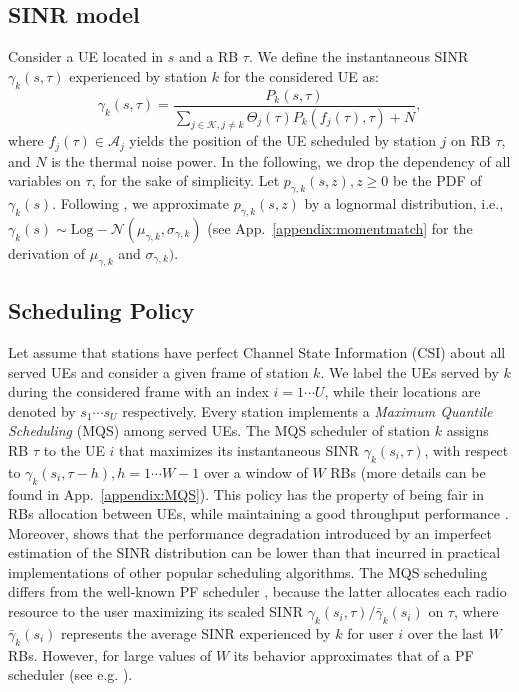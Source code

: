 \documentclass[draftcls,onecolumn]{IEEEtran}
\theoremstyle{plain}
\theoremstyle{definition}
\begin{document}
\subsection{SINR model}\label{subsec:sinrmodel}
Consider a UE located in $s$ and a RB $\tau$. We define the instantaneous SINR $\gamma_k(s,\tau)$ experienced by station $k$ for the considered UE as:
\begin{equation}\label{eq:sinrdef}
 \gamma_k(s,\tau)=\frac{P_{k}(s,\tau)}{\sum_{j \in \mathcal{K}, j \neq k} \Theta_j(\tau) P_{k}(f_j(\tau),\tau) +N}, 
\end{equation}
where $f_j(\tau) {\in} \mathcal{A}_j$ yields the position of the UE scheduled by station $j$ on RB $\tau$, and $N$ is the thermal noise power. In the following, we drop the dependency of all variables on $\tau$, for the sake of simplicity. Let $p_{\gamma,k}(s,z), z \geq 0$ be the PDF of $\gamma_k(s)$. Following \cite{kostic, fischione}, we approximate $p_{\gamma,k}(s,z)$ by a lognormal distribution, i.e., $\gamma_k(s){\sim} \text{Log}{-}\mathcal{N}(\mu_{\gamma,k},\sigma_{\gamma,k})$ (see App.~\ref{appendix:momentmatch} for the derivation of $\mu_{\gamma,k}$ and $\sigma_{\gamma,k})$.





\subsection{Scheduling Policy}
Let assume that stations have perfect Channel State Information (CSI) about all served UEs and consider a given frame of station $k$. We label the UEs served by $k$ during the considered frame with an index $i=1\cdots U$, while their locations are denoted by $s_1 \cdots s_U$ respectively. Every station implements a {\it Maximum Quantile Scheduling} \cite{bonaldsched,MQS2} (MQS) among served UEs. 
The MQS scheduler of station $k$ assigns RB $\tau$ to the UE $i$ that maximizes its instantaneous SINR $\gamma_k(s_i,\tau)$, with respect to $\gamma_k(s_i,\tau-h),h=1\cdots W-1$ over a window of $W$ RBs (more details can be found in App.~\ref{appendix:MQS}).
This policy has the property of being fair in RBs allocation between UEs, while maintaining a good throughput performance \cite{MQS2}. Moreover, \cite{MQS2} shows that the performance degradation introduced by an imperfect estimation of the SINR distribution can be lower than that incurred in practical implementations of other popular scheduling algorithms. The MQS scheduling differs from the well-known PF scheduler \cite{KellyPF}, because the latter allocates each radio resource to the user maximizing its scaled SINR $\gamma_k(s_i,\tau)/\bar{\gamma}_k(s_i)$ on $\tau$, where $\bar{\gamma}_k(s_i)$ represents 
the average SINR experienced by $k$ for user $i$ over the last $W$ RBs. 
However, for large values of $W$ its behavior approximates that of a PF scheduler (see e.g. \cite{bonaldsched}). 
\end{document}
